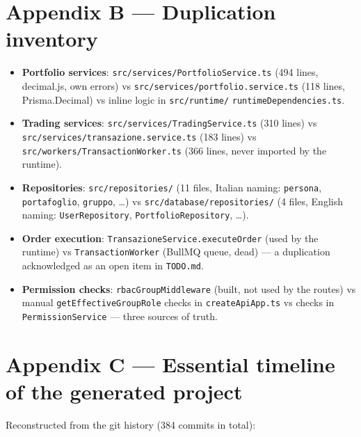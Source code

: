 \documentclass[11pt,a4paper]{article}
\newcommand{\file}[1]{\texttt{\small #1}}
\begin{document}
\section{Appendix B --- Duplication inventory}

\begin{itemize}[leftmargin=1.5em,itemsep=2pt]
  \sloppy
  \item \textbf{Portfolio services}: \file{src/services/PortfolioService.ts} (494 lines, decimal.js, own errors) vs \file{src/services/portfolio.service.ts} (118 lines, Prisma.Decimal) vs inline logic in \file{src/runtime/} \file{runtimeDependencies.ts}.
  \item \textbf{Trading services}: \file{src/services/TradingService.ts} (310 lines) vs \file{src/services/transazione.service.ts} (183 lines) vs \file{src/workers/TransactionWorker.ts} (366 lines, never imported by the runtime).
  \item \textbf{Repositories}: \file{src/repositories/} (11 files, Italian naming: \file{persona}, \file{portafoglio}, \file{gruppo}, \dots) vs \file{src/database/repositories/} (4 files, English naming: \file{UserRepository}, \file{PortfolioRepository}, \dots).
  \item \textbf{Order execution}: \file{TransazioneService.executeOrder} (used by the runtime) vs \file{TransactionWorker} (BullMQ queue, dead) --- a duplication acknowledged as an open item in \file{TODO.md}.
  \item \textbf{Permission checks}: \file{rbacGroupMiddleware} (built, not used by the routes) vs manual \file{getEffectiveGroupRole} checks in \file{createApiApp.ts} vs checks in \file{PermissionService} --- three sources of truth.
\end{itemize}

\section{Appendix C --- Essential timeline of the generated project}

Reconstructed from the git history (384 commits in total):
\end{document}
